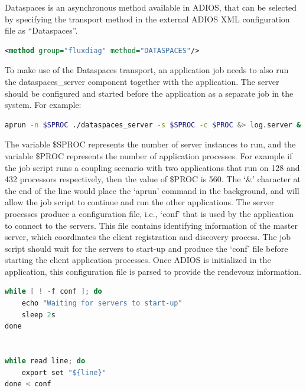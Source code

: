 Dataspaces is an asynchronous method available in ADIOS, that can be selected by specifying 
the transport method in the external ADIOS XML configuration file as ``Dataspaces''.

\begin{lstlisting}[language=XML, caption=Select Dataspaces as a transport method in the configuration file example.]
<method group="fluxdiag" method="DATASPACES"/>
\end{lstlisting}

To make use of the Dataspaces transport, an application job needs to also run the dataspaces\_server 
component together with the application. The server should be configured and started 
before the application as a separate job in the system. For example:

\begin{lstlisting}[language=bash, caption=Start the server component in a job file first.]
aprun -n $SPROC ./dataspaces_server -s $SPROC -c $PROC &> log.server &
\end{lstlisting}

The variable \$SPROC represents the number of server instances to run, and the 
variable \$PROC represents the number of application processes. For example if 
the job script runs a coupling scenario with two applications that run on 128 and 
432 processors respectively, then the value of \$PROC is 560. The `\&' character 
at the end of the line would place the `aprun' command in the background, and will 
allow the job script to continue and run the other applications. The server processes 
produce a configuration file, i.e., `conf' that is used by the application  
to connect to the servers. This file contains identifying information of the 
master server, which coordinates the client registration 
and discovery process. The job script should wait for the servers to start-up and 
produce the `conf' file before starting the client application processes. 
Once ADIOS is initialized in the application, this configuration file is parsed
to provide the rendevouz information. 

\begin{lstlisting}[language=C, caption=Wait for server start-up completion and export the configuration to environment variables.]
while [ ! -f conf ]; do
	echo "Waiting for servers to start-up"
	sleep 2s
done


while read line; do
	export set "${line}"
done < conf
\end{lstlisting}

